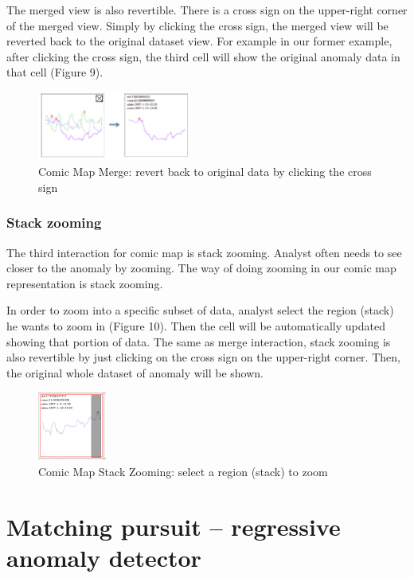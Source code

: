 \documentclass{vgtc}                          %
\begin{document}
The merged view is also revertible. There is a cross sign on the upper-right corner of the merged view. Simply by clicking the cross sign, the merged view will be reverted back to the original dataset view. For example in our former example, after clicking the cross sign, the third cell will show the original anomaly data in that cell (Figure 9).

\begin{figure}[htb]
	\centering
	\includegraphics[width=0.45\textwidth]{merge2.jpg}
	\caption{Comic Map Merge: revert back to original data by clicking the cross sign}
\end{figure}

\subsubsection{Stack zooming}
The third interaction for comic map is stack zooming. Analyst often needs to see closer to the anomaly by zooming. The way of doing zooming in our comic map representation is stack zooming.

In order to zoom into a specific subset of data, analyst select the region (stack) he wants to zoom in (Figure 10). Then the cell will be automatically updated showing that portion of data. 
The same as merge interaction, stack zooming is also revertible by just clicking on the cross sign on the upper-right corner. Then, the original whole dataset of anomaly will be shown.

\begin{figure}[htb]
	\centering
	\includegraphics[width=0.20\textwidth]{zoom.jpg}
	\caption{Comic Map Stack Zooming: select a region (stack) to zoom}
\end{figure}

\section{Matching pursuit -- regressive anomaly detector}
\end{document}
